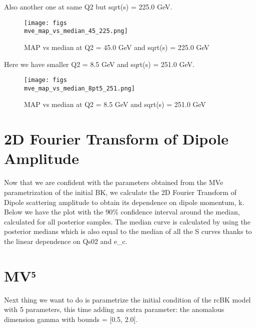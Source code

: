 \documentclass{article}
\begin{document}
Also another one at same Q2 but sqrt(s) = 225.0 GeV.

\begin{figure}
\centering
\texttt{[image: figs\\mve\_map\_vs\_median\_45\_225.png]}
\caption{MAP vs median at Q2 = 45.0 GeV and sqrt(s) = 225.0 GeV}
\label{fig:mve_map_vs_median_45_225}
\end{figure}

Here we have smaller Q2 = 8.5 GeV and sqrt(s) = 251.0 GeV.

\begin{figure}
\centering
\texttt{[image: figs\\mve\_map\_vs\_median\_8pt5\_251.png]}
\caption{MAP vs median at Q2 = 8.5 GeV and sqrt(s) = 251.0 GeV}
\label{fig:mve_map_vs_median_8pt5_251}
\end{figure}

\section{2D Fourier Transform of Dipole Amplitude}

Now that we are confident with the parameters obtained from the MVe parametrization of the initial BK, we calculate the 2D Fourier Transform of Dipole scattering amplitude to obtain its dependence on dipole momentum, k. Below we have the plot with the 90\% confidence interval around the median, calculated for all posterior samples. The median curve is calculated by using the posterior medians which is also equal to the median of all the S curves thanks to the linear dependence on Qs02 and e_c. 

\section{MV⁵}
Next thing we want to do is parametrize the initial condition of the rcBK model with 5 parameters, this time adding an extra parameter: the anomalous dimension gamma with bounds = [0.5, 2.0].
\end{document}
